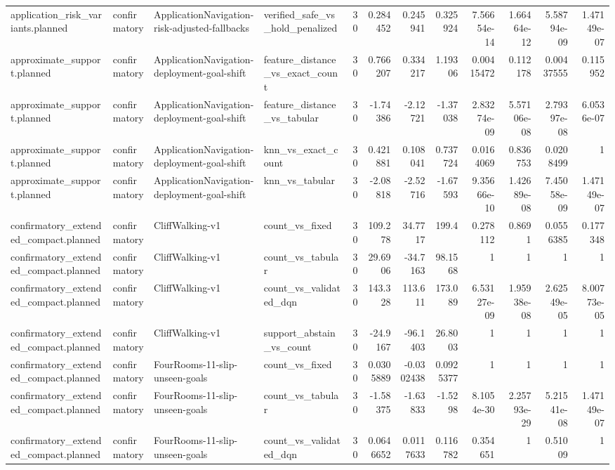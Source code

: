 \begin{longtable}{llllrrrrrrrr}
application\_risk\_variants.planned & confirmatory & ApplicationNavigation-risk-adjusted-fallbacks & verified\_safe\_vs\_hold\_penalized & 30 & 0.284452 & 0.245941 & 0.325924 & 7.56654e-14 & 1.66464e-12 & 5.58794e-09 & 1.47149e-07 \\
approximate\_support.planned & confirmatory & ApplicationNavigation-deployment-goal-shift & feature\_distance\_vs\_exact\_count & 30 & 0.766207 & 0.334217 & 1.19306 & 0.00415472 & 0.112178 & 0.00437555 & 0.115952 \\
approximate\_support.planned & confirmatory & ApplicationNavigation-deployment-goal-shift & feature\_distance\_vs\_tabular & 30 & -1.74386 & -2.12721 & -1.37038 & 2.83274e-09 & 5.57106e-08 & 2.79397e-08 & 6.0536e-07 \\
approximate\_support.planned & confirmatory & ApplicationNavigation-deployment-goal-shift & knn\_vs\_exact\_count & 30 & 0.421881 & 0.108041 & 0.737724 & 0.0164069 & 0.836753 & 0.0208499 & 1 \\
approximate\_support.planned & confirmatory & ApplicationNavigation-deployment-goal-shift & knn\_vs\_tabular & 30 & -2.08818 & -2.52716 & -1.67593 & 9.35666e-10 & 1.42689e-08 & 7.45058e-09 & 1.47149e-07 \\
confirmatory\_extended\_compact.planned & confirmatory & CliffWalking-v1 & count\_vs\_fixed & 30 & 109.278 & 34.7717 & 199.4 & 0.278112 & 0.8691 & 0.0556385 & 0.177348 \\
confirmatory\_extended\_compact.planned & confirmatory & CliffWalking-v1 & count\_vs\_tabular & 30 & 29.6906 & -34.7163 & 98.1568 & 1 & 1 & 1 & 1 \\
confirmatory\_extended\_compact.planned & confirmatory & CliffWalking-v1 & count\_vs\_validated\_dqn & 30 & 143.328 & 113.611 & 173.089 & 6.53127e-09 & 1.95938e-08 & 2.62549e-05 & 8.00773e-05 \\
confirmatory\_extended\_compact.planned & confirmatory & CliffWalking-v1 & support\_abstain\_vs\_count & 30 & -24.9167 & -96.1403 & 26.8003 & 1 & 1 & 1 & 1 \\
confirmatory\_extended\_compact.planned & confirmatory & FourRooms-11-slip-unseen-goals & count\_vs\_fixed & 30 & 0.0305889 & -0.0302438 & 0.0925377 & 1 & 1 & 1 & 1 \\
confirmatory\_extended\_compact.planned & confirmatory & FourRooms-11-slip-unseen-goals & count\_vs\_tabular & 30 & -1.58375 & -1.63833 & -1.5298 & 8.1054e-30 & 2.25793e-29 & 5.21541e-08 & 1.47149e-07 \\
confirmatory\_extended\_compact.planned & confirmatory & FourRooms-11-slip-unseen-goals & count\_vs\_validated\_dqn & 30 & 0.0646652 & 0.0117633 & 0.116782 & 0.354651 & 1 & 0.51009 & 1 \\

\end{longtable}
